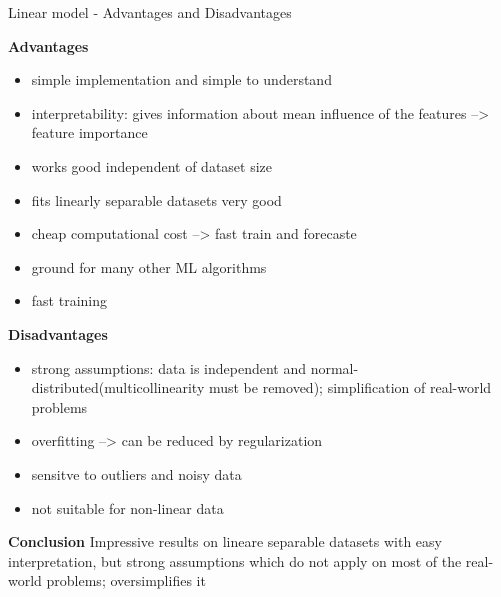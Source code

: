 \documentclass[11pt,compress,t,notes=noshow, xcolor=table]{beamer}
\begin{document}
\begin{frame}{Linear model - Advantages and Disadvantages}

\textbf{Advantages}
\begin{itemize}
\item simple implementation and simple to understand
\item interpretability: gives information about mean influence of the features --> feature importance
\item works good independent of dataset size
\item fits linearly separable datasets very good
\item cheap computational cost --> fast train and forecaste
\item ground for many other ML algorithms
\item fast training
\end{itemize}


\textbf{Disadvantages}
\begin{itemize}
\item strong assumptions: data is independent and normal-distributed(multicollinearity must be removed); simplification of real-world problems
\item overfitting --> can be reduced by regularization
\item sensitve to outliers and noisy data 
\item not suitable for non-linear data
\end{itemize}

\textbf{Conclusion}
Impressive results on lineare separable datasets with easy interpretation, but strong assumptions which do not apply on most of the real-world problems; oversimplifies it

\end{frame}







\scriptsize
\end{document}
